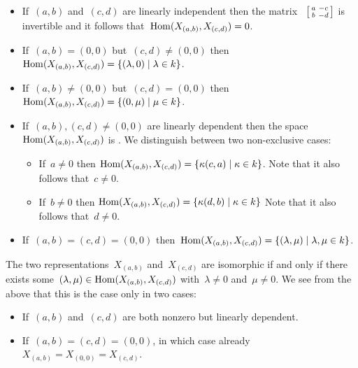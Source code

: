 \begin{itemize}
  \item
    If~$(a,b)$ and~$(c,d)$ are linearly independent then the matrix~%
    $
      \begin{bsmallmatrix}
        a & -c  \\
        b & -d
      \end{bsmallmatrix}
    $ %
    is invertible and it follows that~$\operatorname{Hom}(X_{(a,b)}, X_{(c,d)}) = 0$.
  \item
    If~$(a,b) = (0,0)$ but~$(c,d) \neq (0,0)$ then~$\Hom(X_{(a,b)}, X_{(c,d)}) = \{ (\lambda, 0) \suchthat \lambda \in k \}$.
  \item
    If~$(a,b) \neq (0,0)$ but~$(c,d) = (0,0)$ then~$\Hom(X_{(a,b)}, X_{(c,d)}) = \{ (0, \mu) \suchthat \mu \in k \}$.
  \item
    If~$(a,b), (c,d) \neq (0,0)$ are linearly dependent then the space~$\operatorname{Hom}(X_{(a,b)}, X_{(c,d)})$ is . We distinguish between two non-exclusive cases:
    \begin{itemize}
      \item
        If~$a \neq 0$ then $\Hom(X_{(a,b)}, X_{(c,d)}) = \{ \kappa(c,a) \suchthat \kappa \in k \}$.
        Note that it also follows that~$c \neq 0$.
      \item
        If~$b \neq 0$ then $\Hom(X_{(a,b)}, X_{(c,d)}) = \{ \kappa(d,b) \suchthat \kappa \in k \}$
        Note that it also follows that~$d \neq 0$.
    \end{itemize}
  \item
    If~$(a,b) = (c,d) = (0,0)$ then~$\Hom(X_{(a,b)}, X_{(c,d)}) = \{ (\lambda, \mu) \suchthat \lambda, \mu \in k \}$.
\end{itemize}
The two representations~$X_{(a,b)}$ and~$X_{(c,d)}$ are isomorphic if and only if there exists some~$(\lambda, \mu) \in \operatorname{Hom}(X_{(a,b)}, X_{(c,d)})$ with~$\lambda \neq 0$ and~$\mu \neq 0$.
We see from the above that this is the case only in two cases:
\begin{itemize}
  \item
    If~$(a,b)$ and~$(c,d)$ are both nonzero but linearly dependent.
  \item
    If~$(a,b) = (c,d) = (0,0)$, in which case already~$X_{(a,b)} = X_{(0,0)} = X_{(c,d)}$.
\end{itemize}




